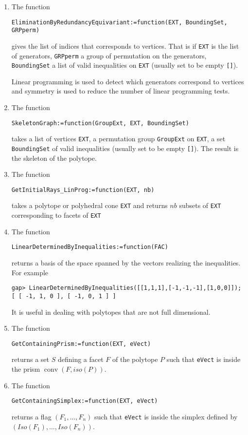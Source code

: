 \documentclass[12pt]{amsart}
\DeclareMathOperator{\conv}{conv}
\begin{document}
\begin{enumerate}
\item The function
\begin{verbatim}
EliminationByRedundancyEquivariant:=function(EXT, BoundingSet, GRPperm)
\end{verbatim}
gives the list of indices that corresponds to vertices.
That is if {\tt EXT} is the list of generators,
{\tt GRPperm} a group of permutation on the generators,
{\tt BoundingSet} a list of valid inequalities on {\tt EXT}
(usually set to be empty {\tt []}).

Linear programming is used to detect which generators correspond to
vertices and symmetry is used to reduce the number of linear programming
tests.

\item The function
\begin{verbatim}
SkeletonGraph:=function(GroupExt, EXT, BoundingSet)
\end{verbatim}
takes a list of vertices {\tt EXT}, a permutation group {\tt GroupExt}
on {\tt EXT}, a set {\tt BoundingSet} of valid inequalities
(usually set to be empty {\tt []}).
The result is the skeleton of the polytope.

\item The function
\begin{verbatim}
GetInitialRays_LinProg:=function(EXT, nb)
\end{verbatim}
takes a polytope or polyhedral cone {\tt EXT} and returns $nb$ subsets of
{\tt EXT} corresponding to facets of {\tt EXT}


\item The function
\begin{verbatim}
LinearDeterminedByInequalities:=function(FAC)
\end{verbatim}
returns a basis of the space spanned by the vectors realizing the inequalities.
For example
\begin{verbatim}
gap> LinearDeterminedByInequalities([[1,1,1],[-1,-1,-1],[1,0,0]]);
[ [ -1, 1, 0 ], [ -1, 0, 1 ] ]
\end{verbatim}
It is useful in dealing with polytopes that are not full dimensional.

\item The function
\begin{verbatim}
GetContainingPrism:=function(EXT, eVect)
\end{verbatim}
returns a set $S$ defining a facet $F$ of the polytope $P$ such that {\tt eVect} is inside the prism $\conv(F, iso(P))$.

\item The function
\begin{verbatim}
GetContainingSimplex:=function(EXT, eVect)
\end{verbatim}
returns a flag $(F_1, \dots, F_n)$ such that {\tt eVect} is inside the simplex defined by $(Iso(F_1), \dots, Iso(F_n))$.




\end{enumerate}
\end{document}
